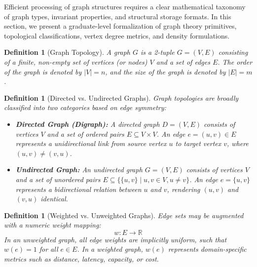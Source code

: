 \documentclass[10pt,journal,compsoc,onecolumn]{IEEEtran}
\newtheorem{definition}[theorem]{Definition}
\begin{document}
Efficient processing of graph structures requires a clear mathematical taxonomy of graph types, invariant properties, and structural storage formats. In this section, we present a graduate-level formalization of graph theory primitives, topological classifications, vertex degree metrics, and density formulations.

\begin{definition}[Graph Topology]
A graph $G$ is a 2-tuple $G = (V, E)$ consisting of a finite, non-empty set of vertices (or nodes) $V$ and a set of edges $E$. The order of the graph is denoted by $|V| = n$, and the size of the graph is denoted by $|E| = m$.
\end{definition}

\begin{definition}[Directed vs. Undirected Graphs]
Graph topologies are broadly classified into two categories based on edge symmetry:
\begin{itemize}
    \item \textbf{Directed Graph (Digraph):} A directed graph $D = (V, E)$ consists of vertices $V$ and a set of ordered pairs $E \subseteq V \times V$. An edge $e = (u, v) \in E$ represents a unidirectional link from source vertex $u$ to target vertex $v$, where $(u, v) \neq (v, u)$.
    \item \textbf{Undirected Graph:} An undirected graph $G = (V, E)$ consists of vertices $V$ and a set of unordered pairs $E \subseteq \{\{u, v\} \mid u, v \in V, u \neq v\}$. An edge $e = \{u, v\}$ represents a bidirectional relation between $u$ and $v$, rendering $(u, v)$ and $(v, u)$ identical.
\end{itemize}
\end{definition}

\begin{definition}[Weighted vs. Unweighted Graphs]
Edge sets may be augmented with a numeric weight mapping:
\begin{equation}
w: E \to \mathbb{R}
\end{equation}
In an unweighted graph, all edge weights are implicitly uniform, such that $w(e) = 1$ for all $e \in E$. In a weighted graph, $w(e)$ represents domain-specific metrics such as distance, latency, capacity, or cost.
\end{definition}
\end{document}
